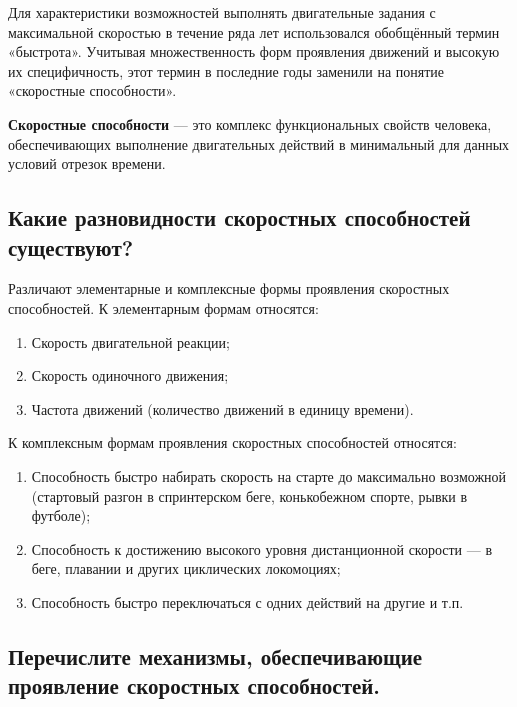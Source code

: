 Для характеристики возможностей выполнять двигательные задания с максимальной скоростью в течение ряда лет использовался обобщённый термин «быстрота». Учитывая множественность форм проявления движений и высокую их специфичность, этот термин в последние годы заменили на понятие «скоростные способности».

\textbf{Скоростные способности} --- это комплекс функциональных свойств человека, обеспечивающих выполнение двигательных действий в минимальный для данных условий отрезок времени.


\subsection{Какие разновидности скоростных способностей существуют?}

Различают элементарные и комплексные формы проявления скоростных способностей. К элементарным формам относятся:
\begin{enumerate}
    \item Скорость двигательной реакции;
    \item Скорость одиночного движения;
    \item Частота движений (количество движений в единицу времени).
\end{enumerate}

К комплексным формам проявления скоростных способностей относятся:
\begin{enumerate}
    \item Способность быстро набирать скорость на старте до максимально возможной (стартовый разгон в спринтерском беге, конькобежном спорте, рывки в футболе);
    \item Способность к достижению высокого уровня дистанционной скорости — в беге, плавании и других циклических локомоциях;
    \item Способность быстро переключаться с одних действий на другие и т.п.
\end{enumerate}


\subsection{Перечислите механизмы, обеспечивающие проявление скоростных способностей.}

